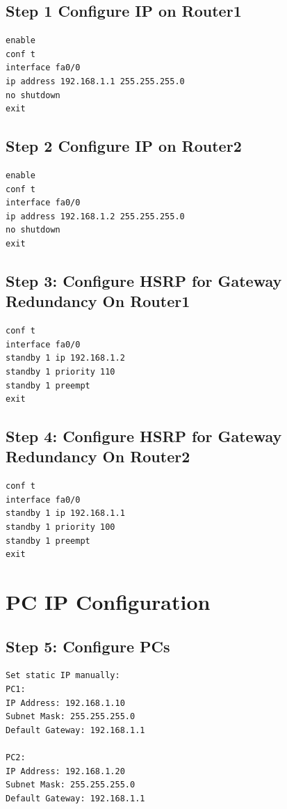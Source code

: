 \documentclass[12pt]{report}
\begin{document}
\subsection*{Step 1 Configure IP on Router1}
\begin{Verbatim}[fontsize=\small, formatcom=\hackfont\color{black}, frame=single]
enable
conf t
interface fa0/0
ip address 192.168.1.1 255.255.255.0
no shutdown
exit
\end{Verbatim}

\subsection*{Step 2 Configure IP on Router2}
\begin{Verbatim}[fontsize=\small, formatcom=\hackfont\color{black}, frame=single]
enable
conf t
interface fa0/0
ip address 192.168.1.2 255.255.255.0
no shutdown
exit
\end{Verbatim}

\subsection*{Step 3: Configure HSRP for Gateway Redundancy On Router1}
\begin{Verbatim}[fontsize=\small, formatcom=\hackfont\color{black}, frame=single]
conf t
interface fa0/0
standby 1 ip 192.168.1.2
standby 1 priority 110
standby 1 preempt
exit
\end{Verbatim}

\subsection*{Step 4: Configure HSRP for Gateway Redundancy On Router2}
\begin{Verbatim}[fontsize=\small, formatcom=\hackfont\color{black}, frame=single]
conf t
interface fa0/0
standby 1 ip 192.168.1.1
standby 1 priority 100
standby 1 preempt
exit
\end{Verbatim}

\section{PC IP Configuration}
\subsection*{Step 5: Configure PCs}
\begin{Verbatim}[fontsize=\small, formatcom=\hackfont\color{black}]
Set static IP manually:
PC1: 
IP Address: 192.168.1.10 
Subnet Mask: 255.255.255.0
Default Gateway: 192.168.1.1

PC2:
IP Address: 192.168.1.20
Subnet Mask: 255.255.255.0
Default Gateway: 192.168.1.1
\end{Verbatim}
\end{document}
